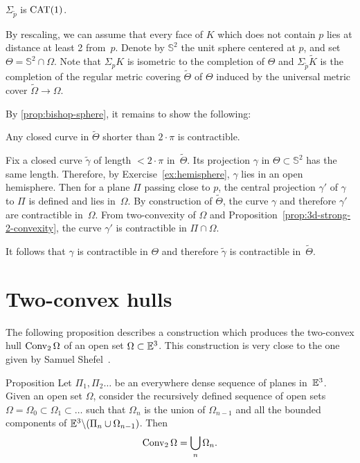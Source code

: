 \begin{clm}{}\label{eq:curv=<1}
$\Sigma_{\tilde p}$ is $\mathrm{CAT}(1)$.
\end{clm}

By  rescaling, we can assume that every face of $K$ which does not contain $p$ lies at distance at least 2 from~$p$.
Denote by $\mathbb{S}^2$ the unit sphere centered at $p$, and 
set $\Theta=\mathbb{S}^2\cap\Omega$.
Note that $\Sigma_pK$ is isometric to the completion of $\Theta$
and $\Sigma_{\tilde p}\tilde K$ is the completion of the regular metric covering $\tilde\Theta$ of $\Theta$  induced by the universal metric cover $\tilde \Omega\to \Omega$.

By \ref{prop:bishop-sphere}, it remains to show  the following:
\begin{clm}{}
Any closed curve in $\tilde\Theta$ shorter than $2\cdot\pi$ is contractible.
\end{clm}

Fix a closed curve $\tilde \gamma$ of length $<2\cdot\pi$ in~$\tilde\Theta$.
Its projection $\gamma$ in $\Theta\subset\mathbb{S}^2$ has the same length.
Therefore, by Exercise~\ref{ex:hemisphere}, $\gamma$ lies in an open hemisphere.
Then for a plane $\Pi$ passing close to $p$,
the central projection $\gamma'$ of $\gamma$ to $\Pi$ is defined and lies in~$\Omega$.
By construction of $\tilde\Theta$, the curve $\gamma$ and therefore $\gamma'$ are contractible in~$\Omega$.
From two-convexity of $\Omega$
and Proposition~\ref{prop:3d-strong-2-convexity},
the curve $\gamma'$ is contractible in $\Pi\cap \Omega$.


It follows that $\gamma$ is contractible in $\Theta$ 
and therefore $\tilde\gamma$ is contractible in~$\tilde\Theta$.
\qeds

\section{Two-convex hulls}

The following proposition 
describes a construction which produces the two-convex hull $\mathop{\rm Conv}\nolimits_2 \Omega$ of an open set $\Omega\subset\mathbb{E}^3$.
This construction is very close to the one given by Samuel Shefel~\cite{shefel-1964}.


\begin{thm}{Proposition}\label{prop:2-conv-construction}
Let $\Pi_1,\Pi_2\dots$ be an everywhere dense
sequence of planes in~$\mathbb{E}^3$.
Given an open set $\Omega$, consider 
the recursively  defined sequence of open sets 
$\Omega=\Omega_0\subset\Omega_1\subset\dots$ 
such that 
$\Omega_n$ is the union of $\Omega_{n-1}$ 
and all the bounded components of 
$\mathbb{E}^3\backslash(\Pi_n\cup \Omega_{n-1})$.
Then 
\[\mathop{\rm Conv}\nolimits_2\Omega=\bigcup_n\Omega_n.\]

\end{thm}


